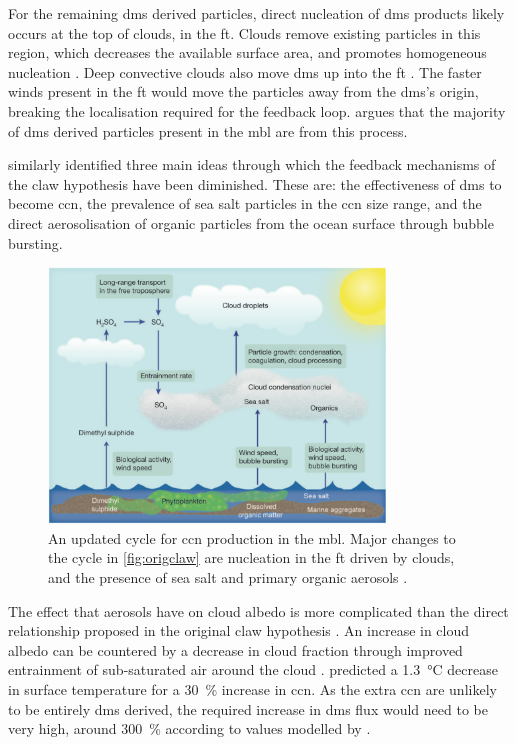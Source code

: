 		For the remaining \gls{dms} derived particles, direct nucleation of \gls{dms} products likely occurs at the top of clouds, in the \gls{ft}. Clouds remove existing particles in this region, which decreases the available surface area, and promotes homogeneous nucleation \citep{perry1994further}. Deep convective clouds also move \gls{dms} up into the \gls{ft} \citep{clarke1998particle}. The faster winds present in the \gls{ft} would move the particles away from the \gls{dms}'s origin, breaking the localisation required for the feedback loop. \citet{quinn:2011iv} argues that the majority of \gls{dms} derived particles present in the \gls{mbl} are from this process.

		\citet{cainey:2007jj} similarly identified three main ideas through which the feedback mechanisms of the \gls{claw} hypothesis have been diminished. These are: the effectiveness of \gls{dms} to become \gls{ccn}, the prevalence of sea salt particles in the \gls{ccn} size range, and the direct aerosolisation of organic particles from the ocean surface through bubble bursting.

		\begin{figure}[!htb]
	 	    \centering
	 	    \includegraphics[width=0.8\textwidth,natwidth=1694,natheight=1284]{Fig/Literature_Review/quinncycle.png}
	 	    \caption{An updated cycle for \gls{ccn} production in the \gls{mbl}. Major changes to the cycle in \cref{fig:origclaw} are nucleation in the \gls{ft} driven by clouds, and the presence of sea salt and primary organic aerosols \citep{quinn:2011iv}.}
	 	    \label{fig:quinncyc}
	 	\end{figure}

		The effect that aerosols have on cloud albedo is more complicated than the direct relationship proposed in the original \gls{claw} hypothesis \citep{quinn:2011iv, cainey:2007jj}. An increase in cloud albedo can be countered by a decrease in cloud fraction through improved entrainment of sub-saturated air around the cloud \citep{zuidema2008shortwave}. \citet{charlson:1987fw} predicted a \SI{1.3}{\celsius} decrease in surface temperature for a \SI{30}{\percent} increase in \gls{ccn}. As the extra \gls{ccn} are unlikely to be entirely \gls{dms} derived, the required increase in \gls{dms} flux would need to be very high, around \SI{300}{\percent} according to values modelled by \citet{woodhouse:2010ed}.

